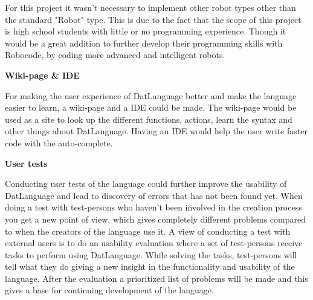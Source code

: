 For this project it wasn't necessary to implement other robot types other than the standard "Robot" type. This is due to the fact that the scope of this project is high school students with little or no programming experience. Though it would be a great addition to further develop their programming skills with Robocode, by coding more advanced and intelligent robots.\newline

\textbf{\LARGE{Wiki-page \& IDE}}

For making the user experience of DatLanguage better and make the language easier to learn, a wiki-page and a IDE could be made. The wiki-page would be used as a site to look up the different functions, actions, learn the syntax and other things about DatLanguage. Having an IDE would help the user write faster code with the auto-complete.   \newline

\textbf{\LARGE{User tests}}

Conducting user tests of the language could further improve the usability of DatLanguage and lead to discovery of errors that has not been found yet. When doing a test with test-persons who haven't been involved in the creation process you get a new point of view, which gives completely different problems compared to when the creators of the language use it. 
A view of conducting a test with external users is to do an usability evaluation where a set of test-persons receive tasks to perform using DatLanguage. While solving the tasks, test-persons will tell what they do giving a new insight in the functionality and usability of the language. 
After the evaluation a prioritized list of problems will be made and this gives a base for continuing development of the language. 